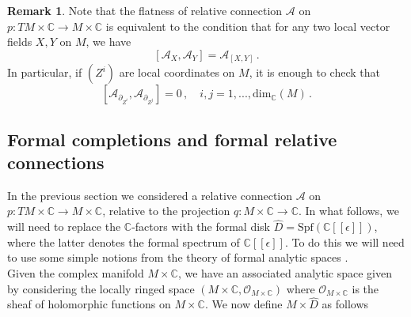 \documentclass{article}
\theoremstyle{definition}
\newtheorem{remark}[theorem]{Remark}
\numberwithin{equation}{section}
\begin{document}
\begin{remark}\label{flatrem}
    Note that the flatness of  relative connection $\mathcal{A}$ on $p:TM\times \mathbb{C}\to M\times \mathbb{C}$ is equivalent to the condition that for any two local vector fields $X,Y$ on $M$, we have 
    \begin{equation}\label{flatsimple}
        [\mathcal{A}_X,\mathcal{A}_Y]=\mathcal{A}_{[X,Y]}\,.
    \end{equation}
    In particular, if $(Z^i)$ are local coordinates on $M$, it is enough to check that 
    \begin{equation}\label{flatcoords}
        [\mathcal{A}_{\partial_{Z^i}}, \mathcal{A}_{\partial_{Z^j}}]=0\,, \quad i,j=1,...,\text{dim}_{\mathbb{C}}(M)\,.    \end{equation}
\end{remark}

\subsection{Formal completions and formal relative connections}\label{formal_setting}
In the previous section we considered a relative connection $\mathcal{A}$ on $p:TM\times \mathbb{C}\to M\times \mathbb{C}$, relative to the projection $q:M\times \mathbb{C}\to \mathbb{C}$. In what follows, we will need to  replace the $\mathbb{C}$-factors with the formal disk $\widehat{D}=\text{Spf}(\mathbb{C}[[\epsilon]])$, where the latter denotes the formal spectrum of $\mathbb{C}[[\epsilon]]$. To do this we will need to use some simple notions from the theory of formal analytic spaces \cite{GrauertRemmert1984}. \\

Given the complex manifold $M\times \mathbb{C}$, we have an associated analytic space given by considering the locally ringed space $(M\times \mathbb{C},\mathcal{O}_{M\times \mathbb{C}})$ where $\mathcal{O}_{M\times \mathbb{C}}$ is the sheaf of holomorphic functions on $M\times \mathbb{C}$. We now define $M\times \widehat{D}$ as follows
\end{document}
